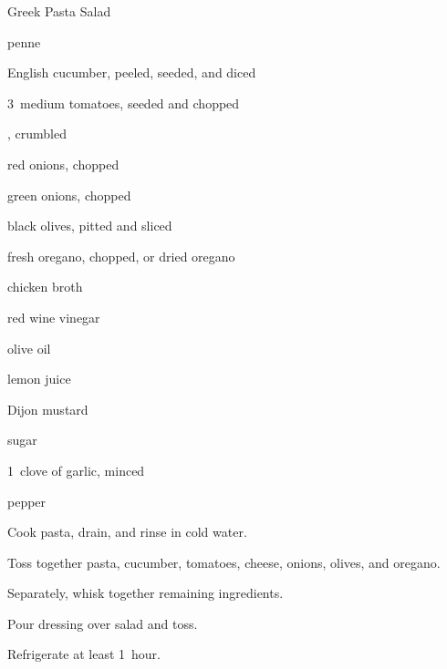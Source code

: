 \begin{recipe}{Greek Pasta Salad}{}{}

\begin{ingredients}
\item {} penne
\item \C{1\half} English cucumber, peeled, seeded, and diced
\item 3~medium tomatoes, seeded and chopped
\item {} , crumbled
\item \C{\half} red onions, chopped
\item \C{\quarter} green onions, chopped
\item \C{\quarter} black olives, pitted and sliced
\item \C{\quarter} fresh oregano, chopped, or  dried oregano
\item \C{\half} chicken broth
\item \C{\quarter} red wine vinegar
\item {} olive oil
\item {} lemon juice
\item {} Dijon mustard
\item {} sugar
\item 1~clove of garlic, minced
\item \tp{\quarter} pepper
\end{ingredients}

\begin{directions}
\item Cook pasta, drain, and rinse in cold water.
\item Toss together pasta, cucumber, tomatoes, cheese, onions, olives, and oregano.
\item Separately, whisk together remaining ingredients.
\item Pour dressing over salad and toss.
\item Refrigerate at least 1~hour.
\end{directions}

\end{recipe}
